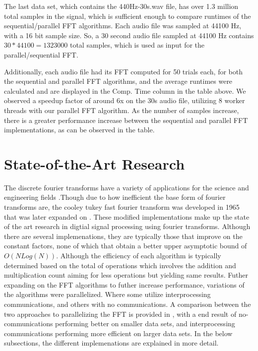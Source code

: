 \documentclass[journal]{IEEEtran}
\begin{document}
	\vspace{1em}
	\par{
		The last data set, which contains the 440Hz-30s.wav file, has over
		1.3 million total samples in the signal, which is sufficient enough
		to compare runtimes of the sequential/parallel FFT algorithms. Each
		audio file was sampled at 44100 Hz, with a 16 bit sample size. So, a 30
		second audio file sampled at 44100 Hz contains $30 * 44100 = 1323000$
		total samples, which is used as input for the parallel/sequential FFT.
	}
	\par{
		Additionally, each audio file had its FFT computed for 50 trials each, 
		for both the sequential and parallel FFT algorithms, and the 
		average runtimes were calculated and are displayed in the Comp. Time 
		column in the table above. We observed a speedup factor of 
		around 6x on the 30s audio file, utilizing 8 worker threads with our 
		parallel FFT algorithm. As the number of samples increase, 
		there is a greater performance increase between the sequential and 
		parallel FFT implementations, as can be observed in the table.
	}

\section{State-of-the-Art Research}

	\par {
		The discrete fourier transforms have a variety of applications for the 
		science and engineering fields \cite{Xiang}.Though due to how inefficient 
		the base form of fourier transforms are, the cooley tukey fast fourier transform 
		was developed in 1965 that was later expanded on \cite{CTA}. These modified implementations 
		make up the state of the art research in digtial signal processing using fourier transforms. 
		Although there are several implemenations, they are typically those that improve on the constant 
		factors, none of which that obtain a better upper asymptotic bound of ${O(N Log(N))}$. Although 
		the efficiency of each algorithm is typically determined based on the total of operations which 
		involves the addition and multiplication count aiming for less operations but yielding same results. 
		Futher expanding on the FFT algorithms to futher increase performance, variations of the algorithms 
		were parallelized. Where some utilize interprocessing communications, and others with no communications. 
		A comparison between the two approaches to parallelizing the FFT is provided in \cite{Pan}, with a 
		end result of no-communications performing better on smaller data sets, and interprocessing communications 
		performing more efficient on larger data sets. In the below subsections, the different implemenations 
		are explained in more detail.
	}
\end{document}
